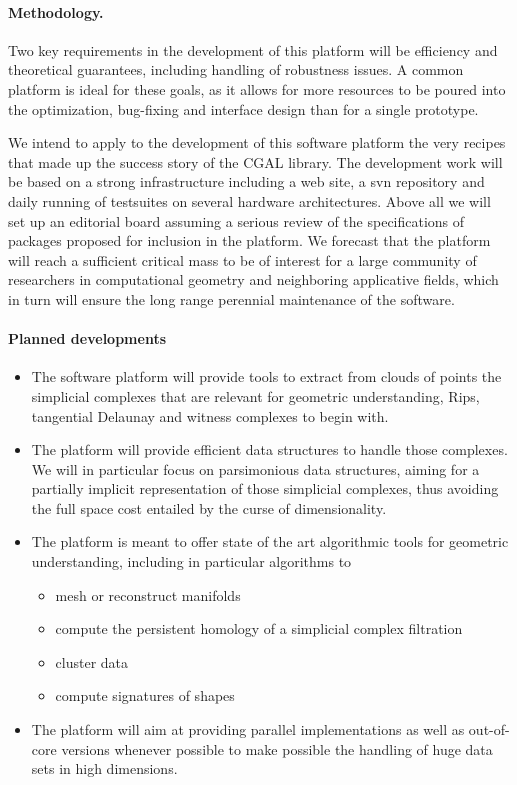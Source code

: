 

\paragraph{ Methodology.} 
Two key requirements in the development of this platform will be
efficiency and theoretical guarantees, including handling of
robustness issues. A common
platform is ideal for these goals, as it allows for more
resources to be poured into the optimization, bug-fixing and interface
design than for a single prototype.

 We intend to apply to the development of this software platform 
the very  recipes that made up the success story
of the CGAL library. 
The development work will be based on a strong infrastructure
including a web site, a svn repository and  daily running of testsuites on several  hardware architectures.
Above all we will set up  an editorial board assuming a  serious review of the 
specifications of packages proposed for inclusion in the platform.
We forecast that the platform will reach a sufficient critical mass
to be of interest for a large community of researchers in
computational geometry and neighboring applicative fields,
which in turn will ensure the long range perennial maintenance
of the software.



\paragraph{Planned developments} 
\begin{itemize}
\item The software platform will provide tools to extract from clouds of points the
simplicial complexes that are relevant for geometric understanding,
Rips, tangential Delaunay  and witness complexes to begin with. 
\item The platform will provide efficient data structures to handle those
complexes. We will in particular  focus on parsimonious data
structures, aiming for a partially implicit representation of those simplicial
complexes, thus avoiding the full space cost entailed by the curse of
dimensionality. 
\item The platform is meant to offer state of the art algorithmic tools for geometric
understanding,
including in particular algorithms to
\begin{itemize}
\item  mesh or reconstruct manifolds
\item  compute the persistent homology of a simplicial complex filtration 
\item cluster data
\item compute signatures of shapes
\end{itemize}
\item The platform will aim at providing parallel implementations as well
as out-of-core versions whenever possible to make possible the
handling of huge data sets in high dimensions.
\end{itemize}


